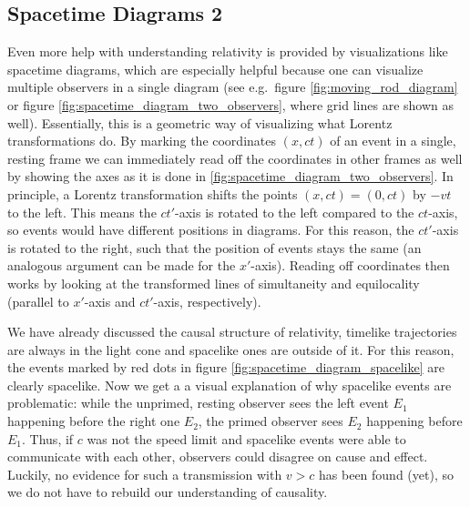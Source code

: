 		\subsection{Spacetime Diagrams 2}
Even more help with understanding relativity is provided by visualizations like spacetime diagrams, which are especially helpful because one can visualize multiple observers in a single diagram (see e.g.~figure \ref{fig:moving_rod_diagram} or figure \ref{fig:spacetime_diagram_two_observers}, where grid lines are shown as well). Essentially, this is a geometric way of visualizing what Lorentz transformations do. By marking the coordinates $(x, ct)$ of an event in a single, resting frame we can immediately read off the coordinates in other frames as well by showing the axes as it is done in \ref{fig:spacetime_diagram_two_observers}. In principle, a Lorentz transformation shifts the points $(x, ct) = (0, ct)$ by $-vt$ to the left. This means the $ct'$-axis is rotated to the left compared to the $ct$-axis, so events would have different positions in diagrams. For this reason, the $ct'$-axis is rotated to the right, such that the position of events stays the same (an analogous argument can be made for the $x'$-axis). Reading off coordinates then works by looking at the transformed lines of simultaneity and equilocality (parallel to $x'$-axis and $ct'$-axis, respectively).




We have already discussed the causal structure of relativity, timelike trajectories are always in the light cone and spacelike ones are outside of it. For this reason, the events marked by red dots in figure \ref{fig:spacetime_diagram_spacelike} are clearly spacelike. Now we get a a visual explanation of why spacelike events are problematic: while the unprimed, resting observer sees the left event $E_1$ happening before the right one $E_2$, the primed observer sees $E_2$ happening before $E_1$. Thus, if $c$ was not the speed limit and spacelike events were able to communicate with each other, observers could disagree on cause and effect. Luckily, no evidence for such a transmission with $v > c$ has been found (yet), so we do not have to rebuild our understanding of causality.\\



